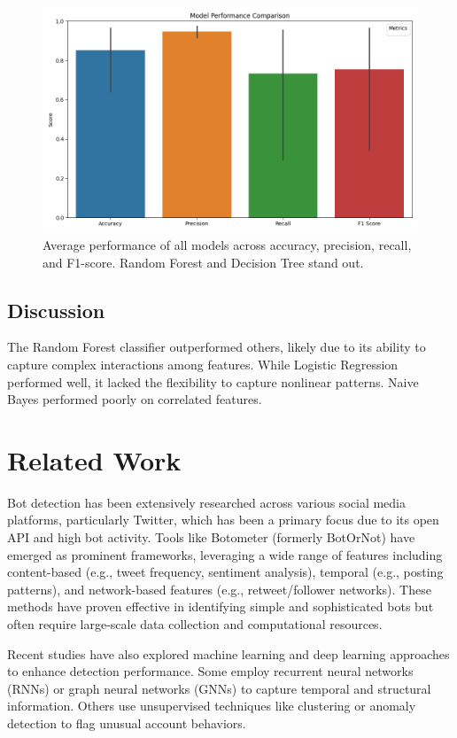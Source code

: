 \documentclass[conference]{IEEEtran}
\begin{document}
\begin{figure}[htbp]
\centerline{\includegraphics[width=\linewidth]{models_average.png}}
\caption{Average performance of all models across accuracy, precision, recall, and F1-score. Random Forest and Decision Tree stand out.}
\label{fig:models_avg}
\end{figure}



\subsection{Discussion}
The Random Forest classifier outperformed others, likely due to its ability to capture complex interactions among features. While Logistic Regression performed well, it lacked the flexibility to capture nonlinear patterns. Naive Bayes performed poorly on correlated features.

\section{Related Work}

Bot detection has been extensively researched across various social media platforms, particularly Twitter, which has been a primary focus due to its open API and high bot activity. Tools like Botometer (formerly BotOrNot) have emerged as prominent frameworks, leveraging a wide range of features including content-based (e.g., tweet frequency, sentiment analysis), temporal (e.g., posting patterns), and network-based features (e.g., retweet/follower networks). These methods have proven effective in identifying simple and sophisticated bots but often require large-scale data collection and computational resources.

Recent studies have also explored machine learning and deep learning approaches to enhance detection performance. Some employ recurrent neural networks (RNNs) or graph neural networks (GNNs) to capture temporal and structural information. Others use unsupervised techniques like clustering or anomaly detection to flag unusual account behaviors.
\end{document}
